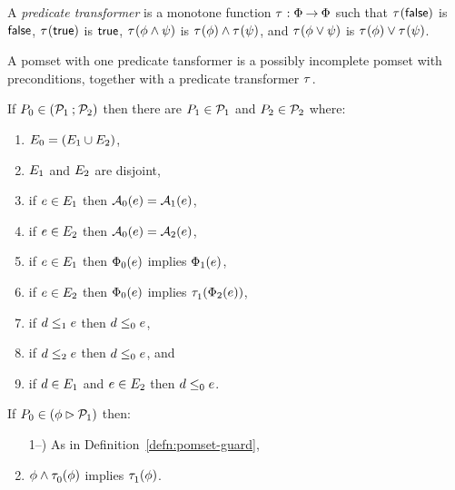 \begin{definition}
  A \emph{predicate transformer} is a monotone function
  $\tau^{}:\Phi\mathbin\rightarrow\Phi$ such that
  $\tau^{}(\mathsf{false})$ is $\mathsf{false}$,
  $\tau^{}(\mathsf{true})$ is $\mathsf{true}$,
  $\tau^{}(\phi\land\psi)$ is $\tau^{}(\phi)\land\tau^{}(\psi)$, and
  $\tau^{}(\phi\lor\psi)$ is $\tau^{}(\phi)\lor\tau^{}(\psi)$.
\end{definition}

\begin{definition}
  A pomset with one predicate tansformer is a possibly incomplete
  pomset with preconditions, together with a predicate transformer $\tau^{}$.
\end{definition}

\begin{definition}
  If $P_0 \in (\mathcal{P}_1\mathbin{;}\mathcal{P}_2)$ then
  there are $P_1\in\mathcal{P}_1$ and $P_2\in\mathcal{P}_2$ where:
  \begin{enumerate}
  \item $E_0 = (E_1\cup E_2)$,
  \item $E_1$ and  $E_2$ are disjoint,
  \item if $e\in E_1$ then $\mathcal{A}_0(e) = \mathcal{A}_1(e)$, 
  \item if $e\in E_2$ then $\mathcal{A}_0(e) = \mathcal{A}_2(e)$,
  \item if $e\in E_1$ then $\Phi_0(e)$ implies $\Phi_1(e)$, 
  \item if $e\in E_2$ then $\Phi_0(e)$ implies $\tau^{}_1(\Phi_2(e))$,
  \item if $d\le_1e$ then $d\le_0e$,
  \item if $d\le_2e$ then $d\le_0e$, and
  \item if $d\in E_1$ and $e\in E_2$ then $d\le_0e$.
  \end{enumerate}
\end{definition}

\begin{definition}
  If $P_0 \in (\phi\mathbin\rhd\mathcal{P}_1)$ then:
  \begin{enumerate}
    \setcounter{enumi}{\value{pomsetGuardCount}}
  \item[1--\thepomsetGuardCount)] As in Definition~\ref{defn:pomset-guard},
  \item $\phi\land\tau^{}_0(\phi)$ implies $\tau^{}_1(\phi)$.
  \end{enumerate}
\end{definition}


